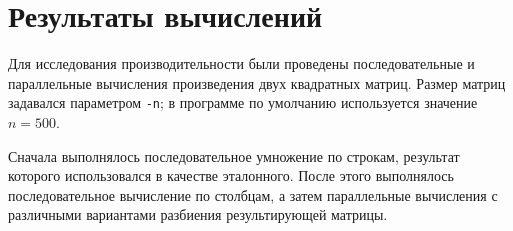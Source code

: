 \documentclass[a4paper, 14pt]{extarticle}
\begin{document}

\section{Результаты вычислений}

Для исследования производительности были проведены
последовательные и параллельные вычисления произведения
двух квадратных матриц. Размер матриц задавался параметром
\texttt{-n}; в программе по умолчанию используется значение
$n = 500$.

Сначала выполнялось последовательное умножение по строкам,
результат которого использовался в качестве эталонного.
После этого выполнялось последовательное вычисление по столбцам,
а затем параллельные вычисления с различными вариантами
разбиения результирующей матрицы.

\begin{table}[H]

\centering

\caption{Время выполнения алгоритмов}


\end{table}
\end{document}
